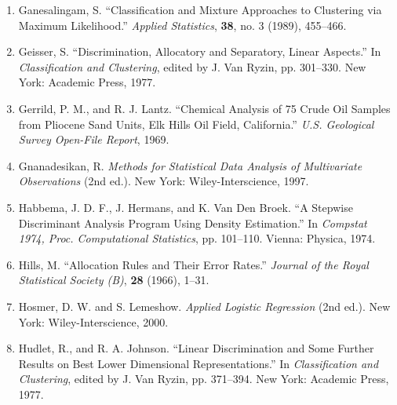 \begin{enumerate}
\item Ganesalingam, S. “Classification and Mixture Approaches to Clustering via Maximum Likelihood.” \textit{Applied Statistics}, \textbf{38}, no. 3 (1989), 455--466.
\item Geisser, S. “Discrimination, Allocatory and Separatory, Linear Aspects.” In \textit{Classification and Clustering}, edited by J. Van Ryzin, pp. 301--330. New York: Academic Press, 1977.
\item Gerrild, P. M., and R. J. Lantz. “Chemical Analysis of 75 Crude Oil Samples from Pliocene Sand Units, Elk Hills Oil Field, California.” \textit{U.S. Geological Survey Open-File Report}, 1969.
\item Gnanadesikan, R. \textit{Methods for Statistical Data Analysis of Multivariate Observations} (2nd ed.). New York: Wiley-Interscience, 1997.
\item Habbema, J. D. F., J. Hermans, and K. Van Den Broek. “A Stepwise Discriminant Analysis Program Using Density Estimation.” In \textit{Compstat 1974, Proc. Computational Statistics}, pp. 101--110. Vienna: Physica, 1974.
\item Hills, M. “Allocation Rules and Their Error Rates.” \textit{Journal of the Royal Statistical Society (B)}, \textbf{28} (1966), 1--31.
\item Hosmer, D. W. and S. Lemeshow. \textit{Applied Logistic Regression} (2nd ed.). New York: Wiley-Interscience, 2000.
\item Hudlet, R., and R. A. Johnson. “Linear Discrimination and Some Further Results on Best Lower Dimensional Representations.” In \textit{Classification and Clustering}, edited by J. Van Ryzin, pp. 371--394. New York: Academic Press, 1977.
\end{enumerate}
